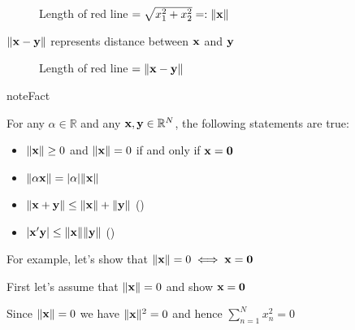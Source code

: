 \documentclass[letterpaper,10pt,english]{jupyterBook}
\begin{document}
\begin{figure}[htbp]
\centering
\capstart

\noindent{}
\caption{Length of red line \(= \sqrt{x_1^2 + x_2^2} =: \|{\bf x}\|\)}\label{\detokenize{04.basic_analysis:vec}}\end{figure}

\sphinxAtStartPar
\(\| {\bf x} - {\bf y} \|\) represents distance between \({\bf x}\) and \({\bf y}\)

\begin{figure}[htbp]
\centering
\capstart

\noindent{}
\caption{Length of red line \(= \|{\bf x} - {\bf y}\|\)}\label{\detokenize{04.basic_analysis:vec-minus}}\end{figure}

\begin{sphinxadmonition}{note}{Fact}

\sphinxAtStartPar
For any \(\alpha \in \mathbb{R}\) and any \({\bf x}, {\bf y} \in \mathbb{R}^N\), the following statements are true:
\begin{itemize}
\item {} 
\sphinxAtStartPar
\(\| {\bf x} \| \geq 0\) and \(\| {\bf x} \| = 0\) if and only if
\({\bf x} = {\bf 0}\)

\item {} 
\sphinxAtStartPar
\(\| \alpha {\bf x} \| = |\alpha| \| {\bf x} \|\)

\item {} 
\sphinxAtStartPar
\(\| {\bf x} + {\bf y} \| \leq  \| {\bf x} \| + \| {\bf y} \|\)
()

\item {} 
\sphinxAtStartPar
\(| {\bf x}' {\bf y} | \leq  \| {\bf x} \| \| {\bf y} \|\)
()

\end{itemize}
\end{sphinxadmonition}

\sphinxAtStartPar
For example, let’s show that \(\| {\bf x} \| = 0 \iff {\bf x} = {\bf 0}\)

\sphinxAtStartPar
First let’s assume that \(\| {\bf x} \| = 0\) and show \({\bf x} = {\bf 0}\)

\sphinxAtStartPar
Since \(\| {\bf x} \| = 0\) we have \(\| {\bf x} \|^2 = 0\) and hence
\(\sum_{n=1}^N x^2_n = 0\)
\end{document}
